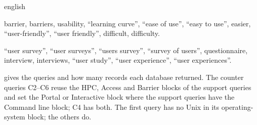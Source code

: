 \begin{onlyin}{english}
\begin{description}
    barrier, barriers, usability, \enquote{learning curve}, \enquote{ease
    of use}, \enquote{easy to use}, easier, \enquote{user-friendly},
    \enquote{user friendly}, difficult, difficulty.
  \item[Survey] \enquote{user survey}, \enquote{user surveys},
    \enquote{users survey}, \enquote{survey of users}, questionnaire,
    interview, interviews, \enquote{user study}, \enquote{user
    experience}, \enquote{user experiences}.
\end{description}
\par\endgroup
{} gives the queries and how many records each
database returned.  The counter queries C2--C6 reuse the HPC, Access and
Barrier blocks of the support queries and set the Portal or Interactive
block where the support queries have the Command line block; C4 has both.
The first query has no Unix in its operating-system block; the others do.
\end{onlyin}
